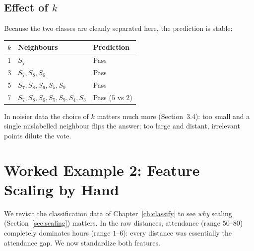 \documentclass[11pt,a4paper]{report}
\theoremstyle{definition}
\theoremstyle{remark}
\begin{document}
	\section{Effect of $k$}
	Because the two classes are cleanly separated here, the prediction is stable:
	\begin{center}
		\begin{tabular}{@{}cll@{}}
			\toprule
			$k$ & Neighbours & Prediction\\
			\midrule
			1 & $S_7$ & Pass\\
			3 & $S_7,S_8,S_6$ & Pass\\
			5 & $S_7,S_8,S_6,S_5,S_9$ & Pass\\
			7 & $S_7,S_8,S_6,S_5,S_9,S_4,S_3$ & Pass ($5$ vs $2$)\\
			\bottomrule
		\end{tabular}
	\end{center}
	In noisier data the choice of $k$ matters much more (Section~3.4): too small and
	a single mislabelled neighbour flips the answer; too large and distant,
	irrelevant points dilute the vote.
	
	\chapter{Worked Example 2: Feature Scaling by Hand}
	\label{ch:scaling}
	
	We revisit the classification data of Chapter~\ref{ch:classify} to see
	\emph{why} scaling (Section~\ref{sec:scaling}) matters. In the raw distances,
	attendance (range $50$--$80$) completely dominates hours (range $1$--$6$): every
	distance was essentially the attendance gap. We now standardize both features.
	
\end{document}
